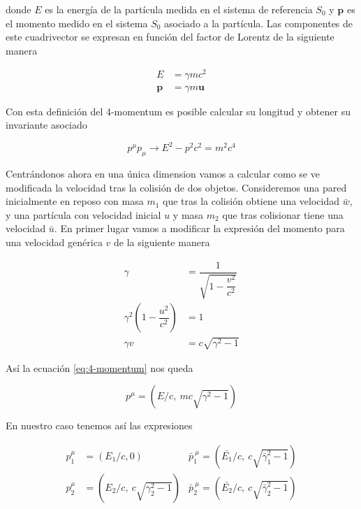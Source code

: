 \documentclass[11pt, spanish]{book}
\begin{document}
donde \( E \) es la energía de la partícula medida en el sistema de referencia \( S_0 \) y \( \mathbf{p} \) es el momento medido en el sistema \( S_0 \) asociado a la partícula. Las componentes de este cuadrivector se expresan en función del factor de Lorentz de la siguiente manera

\begin{align}
    E &= \gamma m c^2 \\
    \mathbf{p} &= \gamma m \mathbf{u}
\end{align}

Con esta definición del 4-momentum es posible calcular su longitud y obtener su invariante asociado

\begin{equation}
    p^\mu p_\mu \longrightarrow E^2 - p^2 c^2 = m^2c^4
    \label{eq:invariamente_momento_energia}
\end{equation}

\vspace{3mm}

Centrándonos ahora en una única dimension vamos a calcular como se ve modificada la velocidad tras la colisión de dos objetos. Consideremos una pared inicialmente en reposo con masa \( m_1 \) que tras la colisión obtiene una velocidad \( \bar{w} \), y una partícula con velocidad inicial \( u \) y masa \( m _2 \) que tras colisionar tiene una velocidad \( \bar{u} \). En primer lugar vamos a modificar la expresión del momento para una velocidad genérica \( v \) de la siguiente manera

\begin{align}
    \gamma &= \dfrac{1}{\sqrt{1 - \dfrac{v^2}{c^2}}} \\
    \gamma^2\left( 1 - \dfrac{u^2}{c^2} \right) &= 1 \nonumber \\
    \gamma v &= c\sqrt{\gamma^2 -1}
\end{align}

Así la ecuación \ref{eq:4-momentum} nos queda

\begin{equation}
    p^\mu = \left( E/c, \: mc\sqrt{\gamma^2 -1} \right)
\end{equation}

En nuestro caso tenemos así las expresiones

\begin{align}
    p^\mu_1 &= \left( E_1/c, 0 \right)  &\bar{p}^{\:\mu}_1 = \left( \bar{E_1}/c, \: c\sqrt{\bar{\gamma}^2_1 -1}  \right) \\
    p^\mu_2 &= \left( E_2/c, \: c\sqrt{\gamma^2_2 -1} \right)   &\bar{p}^{\:\mu}_2 = \left( \bar{E_2}/c, \: c\sqrt{\bar{\gamma}^2_2 -1}  \right) \\
\end{align}
\end{document}
